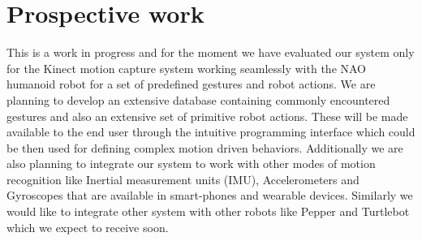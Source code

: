 \documentclass{llncs}
\begin{document}
\section{Prospective work}
	This is a work in progress and for the moment we have evaluated our system only for the Kinect motion capture system working seamlessly with the NAO humanoid robot for a set of predefined gestures and robot actions. We are planning to develop an extensive database containing commonly encountered gestures and also an extensive set of primitive robot actions. These will be made available to the end user through the intuitive programming interface which could be then used for defining complex motion driven behaviors. Additionally we are also planning to integrate our system to work with other modes of motion recognition like Inertial measurement units (IMU), Accelerometers and Gyroscopes that are available in smart-phones and wearable devices. Similarly we would like to integrate other system with other robots like Pepper and Turtlebot which we expect to receive soon.
\end{document}
